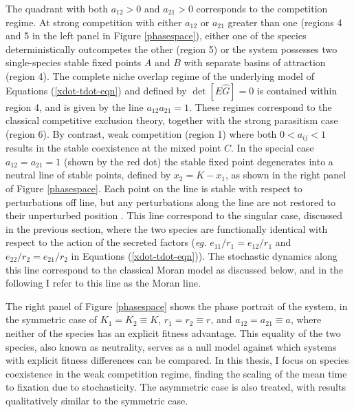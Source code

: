 The quadrant with both $a_{12}>0$ and $a_{21}>0$ corresponds to the competition regime. 
At strong competition with either $a_{12}$ or $a_{21}$ greater than one (regions 4 and 5 in the left panel in Figure \ref{phasespace}), either one of the species deterministically outcompetes the other (region 5) or the system possesses two single-species stable fixed points $A$ and $B$ with separate basins of attraction (region 4). 
The complete niche overlap regime of the underlying model of Equations (\ref{xdot-tdot-eqn}) and defined by $\det[\hat{E}\hat{G}]=0$ is contained within region 4, and is given by the line $a_{12}a_{21}=1$. 
These regimes correspond to the classical competitive exclusion theory, together with the strong parasitism case (region 6). %
By contrast, weak competition (region 1) where both $0<a_{ij}<1$ results in the stable coexistence at the mixed point $C$. 
In the special case $a_{12}=a_{21}=1$ (shown by the red dot) the stable fixed point degenerates into a neutral line of stable points, defined by $x_2 = K - x_1$, as shown in the right panel of Figure \ref{phasespace}. 
Each point on the line is stable with respect to perturbations off line, but any perturbations along the line are not restored to their unperturbed position \cite{McGehee1977a,Case1979}. 
This line correspond to the singular case, discussed in the previous section, where the two species are functionally identical with respect to the action of the secreted factors (\emph{eg.} $e_{11}/r_1=e_{12}/r_1$ and $e_{22}/r_2=e_{21}/r_2$ in Equations (\ref{xdot-tdot-eqn})). 
The stochastic dynamics along this line correspond to the classical Moran model as discussed below, and in the following I refer to this line as the Moran line.

The right panel of Figure \ref{phasespace} shows the phase portrait of the system, in the symmetric case of $ K_1 = K_2\equiv K$, $r_1 = r_2\equiv r$, and $a_{12}=a_{21}\equiv a$, where neither of the species has an explicit fitness advantage. 
This equality of the two species, also known as neutrality, serves as a null model against which systems with explicit fitness differences can be compared. 
In this thesis, I focus on species coexistence in the weak competition regime, finding the scaling of the mean time to fixation due to stochasticity. %
The asymmetric case is also treated, with results qualitatively similar to the symmetric case. 

